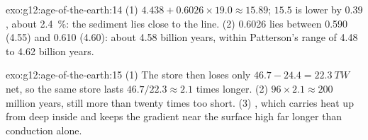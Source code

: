 \begin{solution}{exo:g12:age-of-the-earth:14}
(1) $4.438 + 0.6026 \times 19.0 \approx 15.89$; $15.5$ is lower by $0.39$,
about \qty{2.4}{\percent}: the sediment lies close to the line. (2) 0.6026
lies between 0.590 (4.55) and 0.610 (4.60): about 4.58 billion years, within
Patterson's range of 4.48 to 4.62 billion years.
\end{solution}

\begin{solution}{exo:g12:age-of-the-earth:15}
(1) The store then loses only $46.7 - 24.4 = \qty{22.3}{TW}$ net, so the same
store lasts $46.7/22.3 \approx 2.1$ times longer. (2) $96 \times 2.1 \approx
200$ million years, still more than twenty times too short. (3) , which carries heat up from deep inside and keeps the gradient
near the surface high far longer than conduction alone.
\end{solution}

